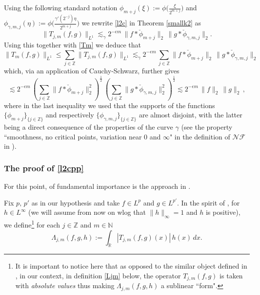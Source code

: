 \documentclass{amsart}
\newcommand{\R}{\mathbb{R}}
\newcommand{\Z}{\mathbb{Z}}
\newcommand{\N}{\mathbb{N}}
\newcommand{\NF}{\mathcal{NF}}
\theoremstyle{definition}
\theoremstyle{remark}
\numberwithin{equation}{section}
\begin{document}
Using the following standard notation
$\phi_{m+j}(\xi):=\phi\Big(\frac{\xi}{2^{m+j}}\Big)$ and $\phi_{\gamma,m,j}(\eta):= \phi\Big(\frac{\gamma'(2^{-j})\eta}{2^{m+j}}\Big)$ we rewrite \eqref{l2c} in  Theorem \ref{smallk2} as
\begin{equation}\label{rewl2c}
\|T_{j,m}(f,g)\|_{L^1}\lesssim_{\gamma} 2^{-\epsilon m}\,\|f*\check{\phi}_{m+j}\|_2\,\|g*\check{\phi}_{\gamma,m,j}\|_{2}.
\end{equation}
Using this together with \eqref{Tm} we deduce that
$$\|T_{m}(f,g)\|_{L^1}\leq \sum_{j\in\Z}\|T_{j,m}(f,g)\|_{L^1}\lesssim_{\gamma} 2^{-\epsilon
m}\,\sum_{j\in\Z}\|f*\check{\phi}_{m+j}\|_2\,\|g*\check{\phi}_{\gamma,m,j}\|_{2}$$
which, via an application of Cauchy-Schwarz, further gives
$$\lesssim 2^{-\epsilon
m}\,\left(\sum_{j\in\Z}\|f*\check{\phi}_{m+j}\|_2^2\right)^\frac{1}{2}\,
\left(\sum_{j\in\Z}\|g*\check{\phi}_{\gamma,m,j}\|_{2}^2\right)^\frac{1}{2}
\lesssim 2^{-\epsilon m}\,\|f\|_2\,\|g\|_2\,,$$
where in the last inequality we used that the supports of the functions $\{\phi_{m+j}\}_{\{j\in\Z\}}$ and  respectively $\{\phi_{\gamma,m,j}\}_{\{j\in\Z\}}$ are almost disjoint, with the latter being a direct consequence of the properties of the curve $\gamma$ (see the property ``smoothness, no critical points, variation near $0$ and $\infty$" in the definition of $\NF$ in \cite{lie2015boundedness}).


\subsubsection{\bf{The proof of \eqref{l2cpp}}} For this point, of fundamental importance is the approach in \cite{lie2015triangle}.

Fix $p,\,p'$ as in our hypothesis and take $f\in L^p$ and $g\in L^{p'}$. In the spirit of \cite[Section 3]{lie2015triangle}, for $h\in L^{\infty}$ (we will assume from now on wlog that $\|h\|_{\infty}=1$ and $h$ is positive), we define\footnote{It is important to notice here that as opposed to the similar object defined in \cite{lie2015triangle}, in our context, in definition \eqref{Ljm} below, the operator $T_{j,m}(f,g)$ is taken with \emph{absolute values} thus making $\Lambda_{j,m}(f,g,h)$ a sublinear ``form".} for each $j\in\Z$ and $m\in\N$
\begin{equation}\label{Ljm}
 \Lambda_{j,m}(f,g,h):=\int_\R |T_{j,m}(f,g)(x)|\, h(x)\,dx.
\end{equation}
\end{document}
